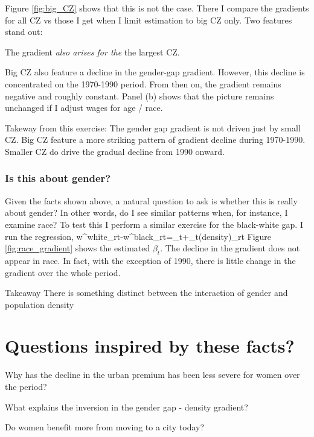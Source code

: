 Figure \ref{fig:big_CZ} shows that this is not the case. There I compare the gradients for all CZ vs those I get when I limit estimation to big CZ only. Two features stand out:
\benu
	\item The gradient \textit{also arises for the} the largest CZ.
	\item Big CZ also feature a decline in the gender-gap gradient. However, this decline is concentrated on the 1970-1990 period. From then on, the gradient remains negative and roughly constant. Panel (b) shows that the picture remains unchanged if I adjust wages for age / race.
\eenu


\begin{block}{Takeway from this exercise:}
	The gender gap gradient is not driven just by small CZ. Big CZ feature a more striking pattern of gradient decline during 1970-1990. Smaller CZ do drive the gradual decline from 1990 onward.
\end{block}



\subsubsection{Is this about gender?}

Given the facts shown above, a natural question to ask is whether this is really about gender? In other words, do I see similar patterns when, for instance, I examine race? To test this I perform a similar exercise for the black-white gap. I run the regression,
\beqns
	w^{white}_{rt}-w^{black}_{rt}=\alpha_t+\beta_t\ln(density)_{rt}
\eeqns
Figure \ref{fig:race_gradient} shows the estimated $\beta_t$. The decline in the gradient does not appear in race. In fact, with the exception of 1990, there is little change in the gradient over the whole period.

\begin{block}{Takeaway}
 There is something distinct between the interaction of gender and population density
\end{block}


 
\section{Questions inspired by these facts?}
\bitem
	\item Why has the decline in the urban premium has been less severe for women over the period?
	\item What explains the inversion in the gender gap - density gradient?
	\item Do women benefit more from moving to a city today?
\eitem


